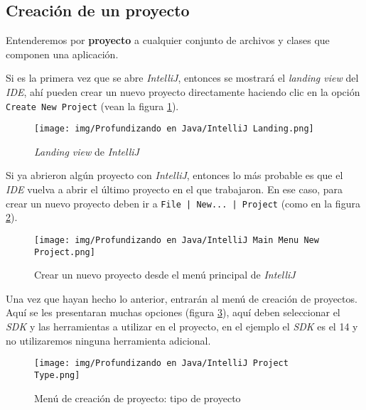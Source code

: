 \subsection{Creación de un proyecto}
  Entenderemos por \textbf{proyecto} a cualquier conjunto de archivos y clases que 
  componen una aplicación.
  
  Si es la primera vez que se abre \textit{IntelliJ}, entonces se mostrará el 
  \textit{landing view} del \textit{IDE}, ahí pueden crear un nuevo proyecto 
  directamente haciendo clic en la opción \texttt{Create New Project} (vean la figura 
  \ref{fig:intellij-lv}).

  \begin{figure}[ht!]
    \centering
    \texttt{[image: img/Profundizando en Java/IntelliJ Landing.png]}
    \caption{\textit{Landing view} de \textit{IntelliJ}}
    \label{fig:intellij-lv}
  \end{figure}

  Si ya abrieron algún proyecto con \textit{IntelliJ}, entonces lo más probable es que
  el \textit{IDE} vuelva a abrir el último proyecto en el que trabajaron.
  En ese caso, para crear un nuevo proyecto deben ir a \texttt{File | New... | Project} 
  (como en la figura \ref{fig:intellij-project-1}).

  \begin{figure}[ht!]
    \centering
    \texttt{[image: img/Profundizando en Java/IntelliJ Main Menu New Project.png]}
    \caption{Crear un nuevo proyecto desde el menú principal de \textit{IntelliJ}}
    \label{fig:intellij-project-1}
  \end{figure}

  \newpage
  Una vez que hayan hecho lo anterior, entrarán al menú de creación de proyectos.
  Aquí se les presentaran muchas opciones (figura \ref{fig:intellij-project-2}), aquí 
  deben seleccionar el \textit{SDK} y las herramientas a utilizar en el proyecto, en el 
  ejemplo el \textit{SDK} es el 14 y no utilizaremos ninguna herramienta adicional.

  \begin{figure}[ht!]
    \centering
    \texttt{[image: img/Profundizando en Java/IntelliJ Project Type.png]}
    \caption{Menú de creación de proyecto: tipo de proyecto}
    \label{fig:intellij-project-2}
  \end{figure}

